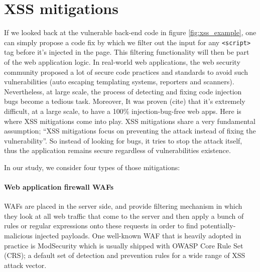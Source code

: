 \section{XSS mitigations}
If we looked back at the vulnerable back-end code in figure \ref{fig:xss_example}, one can simply propose a code fix by which we filter out the input for any \verb|<script>| tag before it’s injected in the page. This filtering functionality will then be part of the web application logic. In real-world web applications, the web security community proposed a lot of secure code practices and standards to avoid such vulnerabilities (auto escaping templating systems, reporters and scanners)\footnotemark{}. Nevertheless, at large scale, the process of detecting and fixing code injection bugs become a tedious task. Moreover, It was proven (cite) that it’s extremely difficult, at a large scale, to have a 100\% injection-bug-free web apps. Here is where XSS mitigations come into play. XSS mitigations share a very fundamental assumption; “XSS mitigations focus on preventing the attack instead of fixing the vulnerability”. So instead of looking for bugs, it tries to stop the attack itself, thus the application remains secure regardless of vulnerabilities existence. 

In our study, we consider four types of those mitigations:

\paragraph{Web application firewall WAFs} WAFs are placed in the server side, and provide filtering mechanism in which they look at all web traffic that come to the server and then apply a bunch of rules or regular expressions onto these requests in order to find potentially-malicious injected payloads. 
One well-known WAF that is heavily adopted in practice is ModSecurity  which is usually shipped with OWASP Core Rule Set (CRS);  a default set of detection and prevention rules for a wide range of XSS attack vector. 

